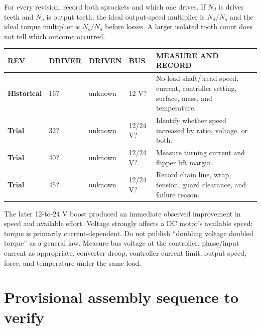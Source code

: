 \documentclass[10pt,openany]{book}
\begin{document}
For every revision, record both sprockets and which one drives. If $N_d$ is driver teeth and $N_o$ is output teeth, the ideal output-speed multiplier is $N_d/N_o$ and the ideal torque multiplier is $N_o/N_d$ before losses. A larger isolated tooth count does not tell which outcome occurred.

\begin{tabularx}{\textwidth}{>{\robcondensed\bfseries}p{0.75in} p{0.8in} p{0.8in} p{0.7in} X}
\toprule
REV & DRIVER & DRIVEN & BUS & MEASURE AND RECORD\\
\midrule
Historical & 16? & unknown & 12 V? & No-load shaft/tread speed, current, controller setting, surface, mass, and temperature.\\
Trial & 32? & unknown & 12/24 V? & Identify whether speed increased by ratio, voltage, or both.\\
Trial & 40? & unknown & 12/24 V? & Measure turning current and flipper lift margin.\\
Trial & 45? & unknown & 12/24 V? & Record chain line, wrap, tension, guard clearance, and failure reason.\\
\bottomrule
\end{tabularx}

The later 12-to-24 V boost produced an immediate observed improvement in speed and available effort. Voltage strongly affects a DC motor's available speed; torque is primarily current-dependent. Do not publish ``doubling voltage doubled torque'' as a general law. Measure bus voltage at the controller, phase/input current as appropriate, converter droop, controller current limit, output speed, force, and temperature under the same load.

\section{Provisional assembly sequence to verify}
\end{document}
